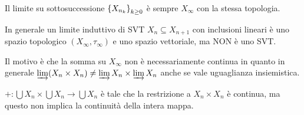 \begin{remark}
Il limite su sottosuccessione $\left\{{X_{n_k}}\right\}_{k\geq 0}$ \`e sempre $X_{\infty}$ con la stessa topologia.
\end{remark}

\begin{remark}
In generale un limite induttivo di SVT $X_n\subseteq X_{n+1}$ con inclusioni lineari \`e uno spazio topologico $(X_\infty,\tau_\infty)$ e uno spazio vettoriale, ma NON \`e uno SVT.

Il motivo \`e che la somma su $X_\infty$ non \`e necessariamente continua in quanto in generale $\varinjlim (X_n\times X_n)\neq \varinjlim X_n\times\varinjlim X_n$ anche se vale uguaglianza insiemistica.

$+:\bigcup X_n\times \bigcup X_n\to \bigcup X_n$ \`e tale che la restrizione a $X_n\times X_n$ \`e continua, ma questo non implica la continuit\`a della intera mappa.
\end{remark}



